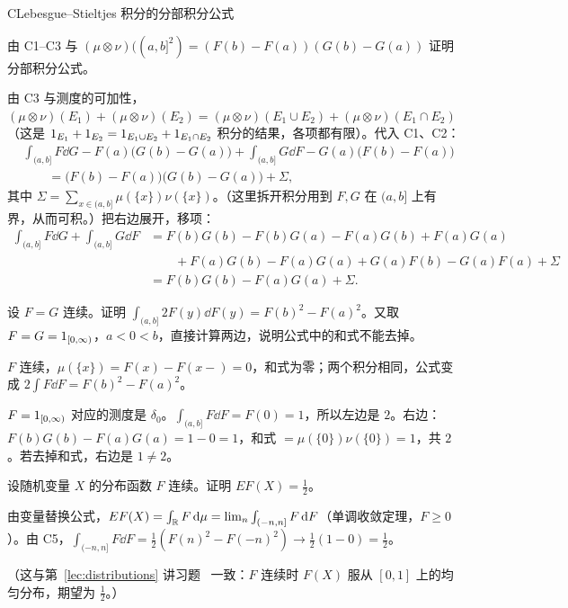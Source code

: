 \begin{probleme}{C}{Lebesgue--Stieltjes 积分的分部积分公式}
\begin{questions}
\item 由 C1--C3 与 $(\mu\otimes\nu)((a,b]^2)=(F(b)-F(a))(G(b)-G(a))$ 证明分部积分公式。
\begin{solution}
由 C3 与测度的可加性，$(\mu\otimes\nu)(E_1)+(\mu\otimes\nu)(E_2)=(\mu\otimes\nu)(E_1\cup E_2)+(\mu\otimes\nu)(E_1\cap E_2)$（这是 $1_{E_1}+1_{E_2}=1_{E_1\cup E_2}+1_{E_1\cap E_2}$ 积分的结果，各项都有限）。代入 C1、C2：
\[
\begin{aligned}
&\int_{(a,b]}F\dd G-F(a)\bigl(G(b)-G(a)\bigr)+\int_{(a,b]}G\dd F-G(a)\bigl(F(b)-F(a)\bigr)\\
&\qquad=\bigl(F(b)-F(a)\bigr)\bigl(G(b)-G(a)\bigr)+\Sigma,
\end{aligned}
\]
其中 $\Sigma=\sum_{x\in(a,b]}\mu(\{x\})\nu(\{x\})$。（这里拆开积分用到 $F,G$ 在 $(a,b]$ 上有界，从而可积。）把右边展开，移项：
\[
\begin{aligned}
\int_{(a,b]}F\dd G+\int_{(a,b]}G\dd F&=F(b)G(b)-F(b)G(a)-F(a)G(b)+F(a)G(a)\\
&\qquad+F(a)G(b)-F(a)G(a)+G(a)F(b)-G(a)F(a)+\Sigma\\
&=F(b)G(b)-F(a)G(a)+\Sigma .
\end{aligned}
\]
\end{solution}

\item 设 $F=G$ 连续。证明 $\int_{(a,b]}2F(y)\dd F(y)=F(b)^2-F(a)^2$。又取 $F=G=1_{[0,\infty)}$，$a<0<b$，直接计算两边，说明公式中的和式不能去掉。
\begin{solution}
$F$ 连续，$\mu(\{x\})=F(x)-F(x-)=0$，和式为零；两个积分相同，公式变成 $2\int F\dd F=F(b)^2-F(a)^2$。

$F=1_{[0,\infty)}$ 对应的测度是 $\delta_0$。$\int_{(a,b]}F\dd F=F(0)=1$，所以左边是 $2$。右边：$F(b)G(b)-F(a)G(a)=1-0=1$，和式 $=\mu(\{0\})\nu(\{0\})=1$，共 $2$。若去掉和式，右边是 $1\neq2$。
\end{solution}

\item 设随机变量 $X$ 的分布函数 $F$ 连续。证明 $EF(X)=\frac12$。
\begin{solution}
由变量替换公式，$EF(X)=\int_{\mathbb{R}} F\,\mathrm{d}\mu=\lim_n\int_{(-n,n]}F\,\mathrm{d} F$（单调收敛定理，$F\geqslant0$）。由 C5，$\int_{(-n,n]}F\dd F=\frac12(F(n)^2-F(-n)^2)\to\frac12(1-0)=\frac12$。

（这与第~\ref{lec:distributions} 讲习题~ 一致：$F$ 连续时 $F(X)$ 服从 $[0,1]$ 上的均匀分布，期望为 $\frac12$。）
\end{solution}
\end{questions}
\end{probleme}

